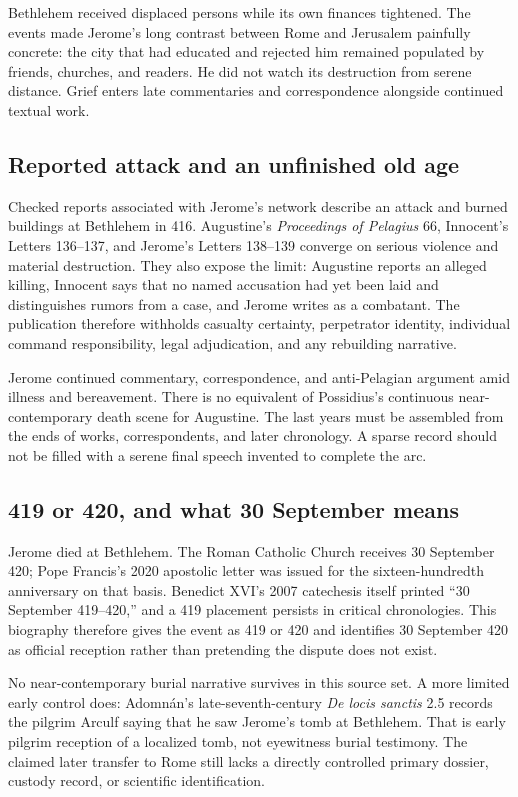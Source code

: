 Bethlehem received displaced persons while its own finances tightened. The
events made Jerome's long contrast between Rome and Jerusalem painfully
concrete: the city that had educated and rejected him remained populated by
friends, churches, and readers. He did not watch its destruction from serene
distance. Grief enters late commentaries and correspondence alongside
continued textual work.

\subsection{Reported attack and an unfinished old age}

Checked reports associated with Jerome's network describe an attack and burned
buildings at Bethlehem in 416. Augustine's \emph{Proceedings of Pelagius} 66,
Innocent's Letters 136--137, and Jerome's Letters 138--139 converge on serious
violence and material destruction. They also expose the limit: Augustine
reports an alleged killing, Innocent says that no named accusation had yet been
laid and distinguishes rumors from a case, and Jerome writes as a combatant.
The publication therefore withholds casualty certainty, perpetrator identity,
individual command responsibility, legal adjudication, and any rebuilding
narrative.

Jerome continued commentary, correspondence, and anti-Pelagian argument amid
illness and bereavement. There is no equivalent of Possidius's continuous
near-contemporary death scene for Augustine. The last years must be assembled
from the ends of works, correspondents, and later chronology. A sparse record
should not be filled with a serene final speech invented to complete the arc.

\subsection{419 or 420, and what 30 September means}

Jerome died at Bethlehem. The Roman Catholic Church receives 30 September 420;
Pope Francis's 2020 apostolic letter was issued for the sixteen-hundredth
anniversary on that basis. Benedict XVI's 2007 catechesis itself printed
``30 September 419--420,'' and a 419 placement persists in critical
chronologies. This biography therefore gives the event as 419 or 420 and
identifies 30 September 420 as official reception rather than pretending the
dispute does not exist.

No near-contemporary burial narrative survives in this source set. A more
limited early control does: Adomn\'an's late-seventh-century \emph{De locis
sanctis} 2.5 records the pilgrim Arculf saying that he saw Jerome's tomb at
Bethlehem. That is early pilgrim reception of a localized tomb, not eyewitness
burial testimony. The claimed later transfer to Rome still lacks a directly
controlled primary dossier, custody record, or scientific identification.

